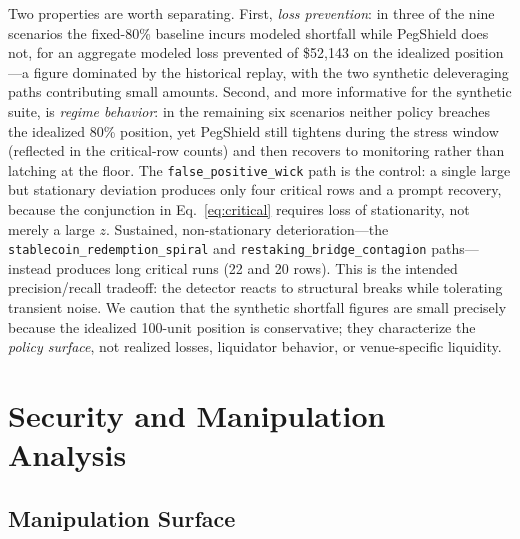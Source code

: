 \documentclass[aps,prx,reprint,nofootinbib,longbibliography]{revtex4-2}
\begin{document}
Two properties are worth separating. First, \emph{loss prevention}: in three of the
nine scenarios the fixed-80\% baseline incurs modeled shortfall while PegShield does
not, for an aggregate modeled loss prevented of \$52{,}143 on the idealized
position---a figure dominated by the historical replay, with the two synthetic
deleveraging paths contributing small amounts. Second, and more informative for the
synthetic suite, is \emph{regime behavior}: in the remaining six scenarios neither
policy breaches the idealized 80\% position, yet PegShield still tightens during the
stress window (reflected in the critical-row counts) and then recovers to
monitoring rather than latching at the floor. The \texttt{false\_positive\_wick}
path is the control: a single large but stationary deviation produces only four
critical rows and a prompt recovery, because the conjunction in
Eq.~\eqref{eq:critical} requires loss of stationarity, not merely a large $z$.
Sustained, non-stationary deterioration---the \texttt{stablecoin\_redemption\_spiral}
and \texttt{restaking\_bridge\_contagion} paths---instead produces long critical
runs (22 and 20 rows). This is the intended precision/recall tradeoff: the detector
reacts to structural breaks while tolerating transient noise. We caution that the
synthetic shortfall figures are small precisely because the idealized 100-unit
position is conservative; they characterize the \emph{policy surface}, not realized
losses, liquidator behavior, or venue-specific liquidity.

\section{Security and Manipulation Analysis}
\label{sec:security}

\subsection{Manipulation Surface}
\end{document}
